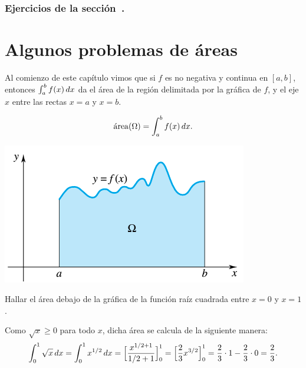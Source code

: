 \subsubsection*{Ejercicios de la sección~.}

\begin{enumerate}
  
\end{enumerate}



\section{Algunos problemas de áreas}

Al comienzo de este capítulo vimos que si $f$ es no negativa y continua en $[a,b]$, entonces $\int_a^b f(x)\,dx$ da el área de la región delimitada por la gráfica de  $f$, y el eje $x$ entre las rectas $x=a$ y $x=b$.

\noindent
\begin{minipage}{.7\textwidth}
$$ \mathrm{\protect\acute{a}rea}(\Omega)=\int_a^b f(x)\,dx.$$
\end{minipage}
\begin{minipage}{.29\textwidth}
  \centering
  \includegraphics[width=.9\textwidth]{pics/area-bajo-curva.png}
\end{minipage}

\begin{example}
  Hallar el área debajo de la gráfica de la función raíz cuadrada entre $x=0$ y $x=1$.

  Como $\sqrt{x}\ge0$ para todo $x$, dicha área se calcula de la siguiente manera:
  \[
  \int_0^1 \sqrt{x}\,dx = \int_0^1 x^{1/2}\,dx 
  = \Big[ \frac{x^{1/2+1}}{1/2+1} \Big]_0^1
  = \Big[ \frac23x^{3/2} \Big]_0^1
  = \frac23 \cdot 1 - \frac23 \cdot 0 = \frac23.
  \]
\end{example}

